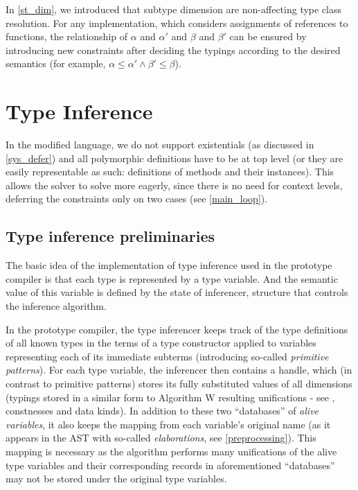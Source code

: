 In \cref{st_dim}, we introduced that subtype dimension are non-affecting type class resolution. For any implementation, which considers assignments of references to functions, the relationship of $\alpha$ and $\alpha'$ and $\beta$ and $\beta'$ can be ensured by introducing new constraints after deciding the typings according to the desired semantics (for example, $\alpha \leq \alpha' \land \beta' \leq \beta$).

\section{Type Inference}

In the modified \cmm{} language, we do not support existentials (as discussed in \cref{sys_defer}) and all polymorphic definitions have to be at top level (or they are easily representable as such: definitions of methods and their instances). This allows the solver to solve more eagerly, since there is no need for context levels, deferring the constraints only on two cases (see \cref{main_loop}).

\subsection{Type inference preliminaries}

The basic idea of the implementation of type inference used in the prototype compiler is that each type is represented by a type variable. And the semantic value of this variable is defined by the state of inferencer, structure that controls the inference algorithm.

In the prototype compiler, the type inferencer keeps track of the type definitions of all known types in the terms of a type constructor applied to variables representing each of its immediate subterms (introducing so-called \emph{primitive patterns}). For each type variable, the inferencer then contains a handle, which (in contrast to primitive patterns) stores its fully substituted values of all dimensions (typings stored in a similar form to Algorithm W resulting unifications - see \cite{damas1982principal}, constnesses and data kinds). In addition to these two ``databases'' of \emph{alive variables}, it also keeps the mapping from each variable's original name (as it appears in the AST with so-called \emph{elaborations}, see \cref{preprocessing}). This mapping is necessary as the algorithm performs many unifications of the alive type variables and their corresponding records in aforementioned ``databases'' may not be stored under the original type variables.

